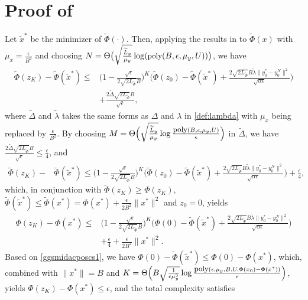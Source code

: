 \documentclass{osudissert96}
\begin{document}
\section{Proof of }
Let $\widetilde x^*$ be the minimizer of $\widetilde \Phi(\cdot)$. Then, applying the results in  to $\widetilde\Phi(x)$ with $\mu_x = \frac{\epsilon}{B^2}$ and choosing $N=\Theta \big(\sqrt{\frac{\widetilde L_y}{\mu_y}}\log (\mbox{\small poly}(B,\epsilon,\mu_y,U))\big)$, we have 
\begin{align*}
\widetilde\Phi(z_{K})-\widetilde\Phi(\widetilde x^*) \leq &  \big(1-\frac{\sqrt{\epsilon}}{2\sqrt{2L_{\widetilde\Phi}}B}\big)^K\Big(\widetilde \Phi(z_{0})-\widetilde \Phi(\widetilde x^*)+\frac{2\sqrt{2L_{\widetilde\Phi}}B\widetilde\lambda  \|y_0^*-y_0^N\|^2}{\sqrt{\alpha\epsilon}}\Big)
\\&+ \frac{2\widetilde\Delta\sqrt{2L_{\widetilde\Phi}}B}{\sqrt{\epsilon}},
\end{align*}
where $\widetilde \Delta$ and $\widetilde \lambda$ takes the same forms as $\Delta$ and $\lambda$ in \cref{def:lambda} with $\mu_x$ being replaced by $\frac{\epsilon}{B^2}$. By choosing $M = \Theta \Big(\sqrt{\frac{\widetilde L_y}{\mu_y}}\log \frac{\mbox{\small poly}(B,\epsilon,\mu_y,U)}{\epsilon}\Big)$ in $\widetilde \Delta$,  we have $\frac{2\widetilde\Delta\sqrt{2L_{\widetilde\Phi}}B}{\sqrt{\epsilon}}\leq \frac{\epsilon}{4}$, and 
\begin{align*}
\widetilde\Phi(z_{K})-&\widetilde\Phi(\widetilde x^*) \leq  \big(1-\frac{\sqrt{\epsilon}}{2\sqrt{2L_{\widetilde\Phi}}B}\big)^K\Big(\widetilde \Phi(z_{0})-\widetilde \Phi(\widetilde x^*)+\frac{2\sqrt{2L_{\widetilde\Phi}}B\widetilde\lambda  \|y_0^*-y_0^N\|^2}{\sqrt{\alpha\epsilon}}\Big)+ \frac{\epsilon}{4},
\end{align*}
which, in conjunction with $\widetilde\Phi(z_K)\geq\Phi(z_K)$, $\widetilde\Phi(\widetilde x^*)\leq\widetilde\Phi(x^*)=\Phi(x^*)+\frac{\epsilon}{2B^2}\|x^*\|^2$ and $z_0=0$, yields 
\begin{align}\label{maiyigelunhuiba}
\Phi(z_{K})-\Phi( x^*) \leq &  \big(1-\frac{\sqrt{\epsilon}}{2\sqrt{2L_{\widetilde\Phi}}B}\big)^K\Big(\Phi(0)-\widetilde \Phi(\widetilde x^*)+\frac{2\sqrt{2L_{\widetilde\Phi}}B\widetilde\lambda  \|y_0^*-y_0^N\|^2}{\sqrt{\alpha\epsilon}}\Big) \nonumber
\\&+ \frac{\epsilon}{4} +\frac{\epsilon}{2B^2}\|x^*\|^2.
\end{align}
Based on \cref{ggsmidacposcs1}, we have $\Phi(0)-\widetilde \Phi(\widetilde x^*) \leq \Phi(0)-\Phi(x^*)$, which, combined with $\|x^*\|= B$ and $K=\Theta \Big(B \sqrt{\frac{1}{\epsilon\mu_y^3}}\log\frac{\mbox{\small poly}(\epsilon,\mu_y,B,U,\Phi(x_{0})-\Phi(x^*))}{\epsilon} \Big)$, yields  $\Phi(z_{K})-\Phi( x^*) \leq \epsilon$, and the total complexity satisfies 
\end{document}

